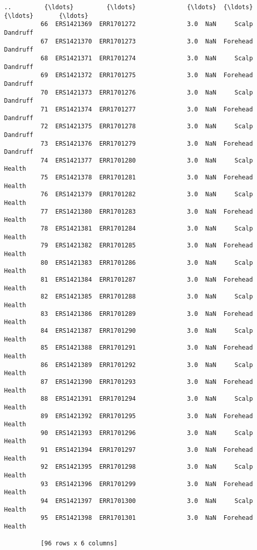 \documentclass[11pt]{article}
\begin{document}
\begin{Verbatim}[commandchars=\\\{\}]
          ..         {\ldots}         {\ldots}              {\ldots}  {\ldots}       {\ldots}       {\ldots}
          66  ERS1421369  ERR1701272              3.0  NaN     Scalp  Dandruff
          67  ERS1421370  ERR1701273              3.0  NaN  Forehead  Dandruff
          68  ERS1421371  ERR1701274              3.0  NaN     Scalp  Dandruff
          69  ERS1421372  ERR1701275              3.0  NaN  Forehead  Dandruff
          70  ERS1421373  ERR1701276              3.0  NaN     Scalp  Dandruff
          71  ERS1421374  ERR1701277              3.0  NaN  Forehead  Dandruff
          72  ERS1421375  ERR1701278              3.0  NaN     Scalp  Dandruff
          73  ERS1421376  ERR1701279              3.0  NaN  Forehead  Dandruff
          74  ERS1421377  ERR1701280              3.0  NaN     Scalp    Health
          75  ERS1421378  ERR1701281              3.0  NaN  Forehead    Health
          76  ERS1421379  ERR1701282              3.0  NaN     Scalp    Health
          77  ERS1421380  ERR1701283              3.0  NaN  Forehead    Health
          78  ERS1421381  ERR1701284              3.0  NaN     Scalp    Health
          79  ERS1421382  ERR1701285              3.0  NaN  Forehead    Health
          80  ERS1421383  ERR1701286              3.0  NaN     Scalp    Health
          81  ERS1421384  ERR1701287              3.0  NaN  Forehead    Health
          82  ERS1421385  ERR1701288              3.0  NaN     Scalp    Health
          83  ERS1421386  ERR1701289              3.0  NaN  Forehead    Health
          84  ERS1421387  ERR1701290              3.0  NaN     Scalp    Health
          85  ERS1421388  ERR1701291              3.0  NaN  Forehead    Health
          86  ERS1421389  ERR1701292              3.0  NaN     Scalp    Health
          87  ERS1421390  ERR1701293              3.0  NaN  Forehead    Health
          88  ERS1421391  ERR1701294              3.0  NaN     Scalp    Health
          89  ERS1421392  ERR1701295              3.0  NaN  Forehead    Health
          90  ERS1421393  ERR1701296              3.0  NaN     Scalp    Health
          91  ERS1421394  ERR1701297              3.0  NaN  Forehead    Health
          92  ERS1421395  ERR1701298              3.0  NaN     Scalp    Health
          93  ERS1421396  ERR1701299              3.0  NaN  Forehead    Health
          94  ERS1421397  ERR1701300              3.0  NaN     Scalp    Health
          95  ERS1421398  ERR1701301              3.0  NaN  Forehead    Health
          
          [96 rows x 6 columns]
\end{Verbatim}
            
\end{document}
